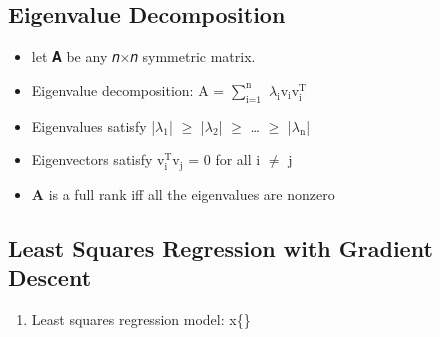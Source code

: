\documentclass[11pt]{article}
\begin{document}
\subsection{Eigenvalue Decomposition}
\label{sec:org48114b0}

\begin{itemize}
\item let 𝐀 be any 𝑛×𝑛 symmetric matrix.
\item Eigenvalue decomposition: A = \(\sum^{\text{n}}_{\text{i=1}}\) \(\lambda_{\text{i}}\)v\(_{\text{i}}\)v\(^{\text{T}}_{\text{i}}\)
\item Eigenvalues satisfy |\(\lambda_{\text{1}}\)| \(\ge\) |\(\lambda_{\text{2}}\)| \(\ge\) \dots{} \(\ge\) |\(\lambda_{\text{n}}\)|
\item Eigenvectors satisfy v\(^{\text{T}}_{\text{i}}\)v\(_{\text{j}}\) = 0 for all i \(\ne\) j
\item \textbf{\textbf{A}} is a full rank iff all the eigenvalues are nonzero
\end{itemize}

\subsection{Least Squares Regression with Gradient Descent}
\label{sec:org57bb7fa}

\begin{enumerate}
\item Least squares regression model: x\{\}
\end{enumerate}
\end{document}
